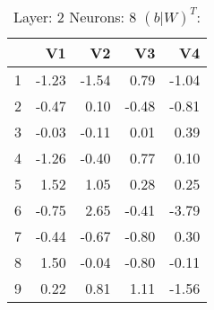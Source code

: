 \begin{table}[ht]
\centering
\begin{tabular}{rrrrr}
  \hline
 & V1 & V2 & V3 & V4 \\ 
  \hline
1 & -1.23 & -1.54 & 0.79 & -1.04 \\ 
  2 & -0.47 & 0.10 & -0.48 & -0.81 \\ 
  3 & -0.03 & -0.11 & 0.01 & 0.39 \\ 
  4 & -1.26 & -0.40 & 0.77 & 0.10 \\ 
  5 & 1.52 & 1.05 & 0.28 & 0.25 \\ 
  6 & -0.75 & 2.65 & -0.41 & -3.79 \\ 
  7 & -0.44 & -0.67 & -0.80 & 0.30 \\ 
  8 & 1.50 & -0.04 & -0.80 & -0.11 \\ 
  9 & 0.22 & 0.81 & 1.11 & -1.56 \\ 
   \hline
\end{tabular}
\caption{Layer: 2 Neurons: 8  $(b|W)^T$: 
} 
\end{table}
